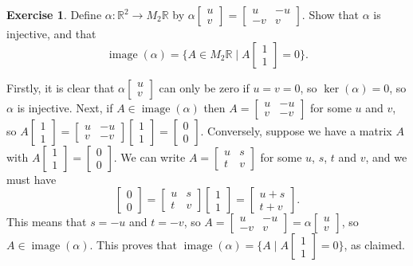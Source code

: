\documentclass{amsart}
\newcommand{\R}         {{\mathbb{R}}}
\newcommand{\img}       {\operatorname{image}}
\newcommand{\bsm}       {\left[\begin{smallmatrix}}
\newcommand{\esm}       {\end{smallmatrix}\right]}
\newcommand{\al}        {\alpha}
\newcommand{\st}        {\;|\;}
\renewcommand{\:}       {\colon}
\theoremstyle{definition}
\newtheorem{exercise}{Exercise}[section]
\renewenvironment{solution}{\SolutionAtEnd}{\endSolutionAtEnd}
\begin{document}
\begin{exercise}
 Define $\al\:\R^2\to M_2\R$ by 
 $\displaystyle \al\bsm u\\ v\esm =\bsm u & -u \\ -v & v\esm$.
 Show that $\al$ is injective, and that 
 \[ \img(\al) =\{A\in M_2\R \st A\bsm 1\\1\esm = 0\}. \]
\end{exercise}
\begin{solution}
 Firstly, it is clear that $\al\bsm u\\ v\esm$ can only be
 zero if $u=v=0$, so $\ker(\al)=0$, so $\al$ is injective.
 Next, if $A\in\img(\al)$ then $A=\bsm u& -u\\ v&-v\esm$ for
 some $u$ and $v$, so
 $A\bsm 1\\1\esm=\bsm u&-u\\ v&-v\esm\bsm 1\\1\esm = 
 \bsm 0\\0\esm$.  Conversely, suppose we have a matrix
 $A$ with $A\bsm 1\\1\esm=\bsm 0\\0\esm$.  We can write
 $A=\bsm u&s\\ t&v\esm$ for some $u$, $s$, $t$ and $v$, and
 we must have
 \[ \bsm 0\\0 \esm = \bsm u&s\\ t&v\esm \bsm 1\\1\esm = 
     \bsm u+s\\ t+v\esm.
 \] 
 This means that $s=-u$ and $t=-v$, so
 $A=\bsm u&-u\\ -v&v\esm=\al\bsm u\\ v\esm$, so
 $A\in\img(\al)$.  This proves that
 $\img(\al)=\{A\st A\bsm 1\\1\esm=0\}$, as claimed.
\end{solution}
\end{document}
